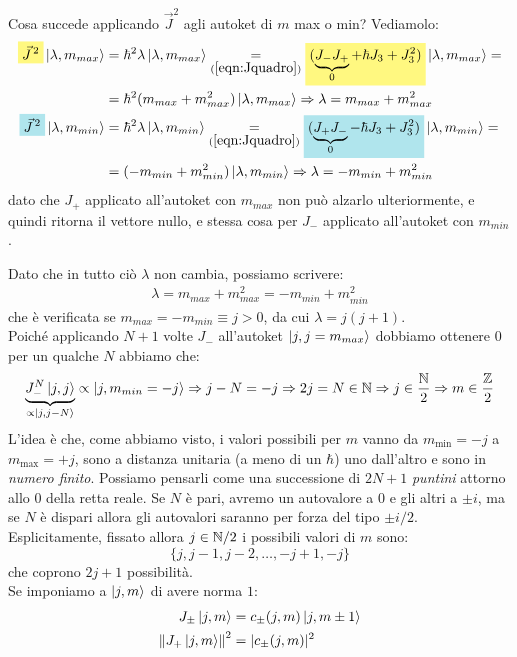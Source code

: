 \documentclass[../../FisicaTeorica.tex]{subfiles}
\begin{document}
Cosa succede applicando $\vec{J}^2$ agli autoket di $m$ max o min? Vediamolo:\begin{align*}
\hlc{Yellow}{\vec{J}^{\,2}} \ket{\lambda, m_{max}} &= \hbar^2 \lambda \ket{\lambda, m_{max}} \underset{(\ref{eqn:Jquadro})}{=} \hlc{Yellow}{(\underbrace{J_- J_+}_{0} + \hbar J_3 + J_3^2)} \ket{\lambda, m_{max}} =
\\&= \hbar^2(m_{max}+m_{max}^2)\ket{\lambda, m_{max}} \Rightarrow \lambda = m_{max} + m^2_{max}\\
\hlc{SkyBlue}{\vec{J}^{\,2}}\ket{\lambda, m_{min}} &= \hbar^2 \lambda \ket{\lambda, m_{min}} \underset{(\ref{eqn:Jquadro})}{=
}\hlc{SkyBlue}{(\underbrace{J_+ J_-}_{0} - \hbar J_3 + J_3^2)} \ket{\lambda, m_{min}} =\\&= (-m_{min}+m_{min}^2) \ket{\lambda, m_{min}} \Rightarrow \lambda = -m_{min} + m_{min}^2
\end{align*}
dato che $J_+$ applicato all'autoket con $m_{max}$ non può alzarlo ulteriormente, e quindi ritorna il vettore nullo, e stessa cosa per $J_-$ applicato all'autoket con $m_{min}$.

Dato che in tutto ciò $\lambda$ non cambia, possiamo scrivere:
\begin{align*}
\lambda = m_{max} + m_{max}^2 = -m_{min} + m_{min}^2
\end{align*}
che è verificata se $m_{max}=-m_{min} \equiv j > 0$, da cui $\lambda=j(j+1)$.\\
Poiché applicando $N+1$ volte $J_-$ all'autoket $\ket{j,j=m_{max}}$ dobbiamo ottenere $0$ per un qualche $N$ abbiamo che:
\[
\underbrace{J_-^N \ket{j,j}}_{\propto \ket{j, j-N}} \propto \ket{j, m_{min} =-j} \Rightarrow  j-N = -j \Rightarrow  2j = N \in \mathbb{N} \Rightarrow  j \in \frac{\mathbb{N}}{2} \Rightarrow  m \in \frac{\mathbb{Z}}{2}
\]
L'idea è che, come abbiamo visto, i valori possibili per $m$ vanno da $m_{\min}=-j$ a $m_{\max}=+j$, sono a distanza unitaria (a meno di un $\hbar$) uno dall'altro e sono in \textit{numero finito}. Possiamo pensarli come una successione di $2N+1$ \textit{puntini}  attorno allo $0$ della retta reale. Se $N$ è pari, avremo un autovalore a $0$ e gli altri a $\pm i$, ma se $N$ è dispari allora gli autovalori saranno per forza del tipo $\pm i/2$.\\


Esplicitamente, fissato allora $j \in \mathbb{N}/2$ i possibili valori di $m$ sono:
\[
\{j, j-1, j-2, \dots, -j+1, -j\}
\]
che coprono $2j+1$ possibilità.\\
Se imponiamo a $\ket{j,m}$ di avere norma $1$: %
\begin{align*}
J_\pm \ket{j,m} &= c_\pm (j,m) \ket{j, m\pm 1}\\
\left\lVert J_+ \ket{j,m}\right\rVert^2&=|c_\pm (j,m)|^2
\end{align*}
\end{document}
